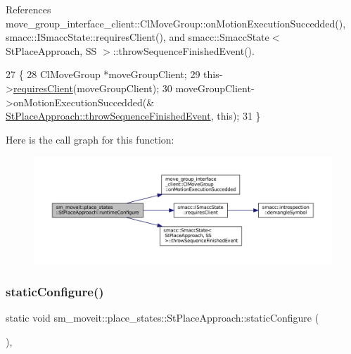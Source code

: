 References move\+\_\+group\+\_\+interface\+\_\+client\+::\+Cl\+Move\+Group\+::on\+Motion\+Execution\+Succedded(), smacc\+::\+I\+Smacc\+State\+::requires\+Client(), and smacc\+::\+Smacc\+State$<$ St\+Place\+Approach, S\+S $>$\+::throw\+Sequence\+Finished\+Event().


\begin{DoxyCode}
27     \{
28         ClMoveGroup *moveGroupClient;
29         this->\hyperlink{classsmacc_1_1ISmaccState_a7f95c9f0a6ea2d6f18d1aec0519de4ac}{requiresClient}(moveGroupClient);
30         moveGroupClient->onMotionExecutionSuccedded(&
      \hyperlink{classsmacc_1_1SmaccState_a49dcfc25824f7e083dd4b999c49ab2b6}{StPlaceApproach::throwSequenceFinishedEvent}, \textcolor{keyword}{this});
31     \}
\end{DoxyCode}
Here is the call graph for this function\+:
\nopagebreak
\begin{figure}[H]
\begin{center}
\leavevmode
\includegraphics[width=350pt]{structsm__moveit_1_1place__states_1_1StPlaceApproach_a287b39f8eb6a5aca4f0b1e63cb275f7a_cgraph}
\end{center}
\end{figure}
\mbox{\label{structsm__moveit_1_1place__states_1_1StPlaceApproach_a18cfb69a3268faad24cd10e4d1ff8877}} 
\subsubsection{\texorpdfstring{static\+Configure()}{staticConfigure()}}
{\footnotesize\ttfamily static void sm\+\_\+moveit\+::place\+\_\+states\+::\+St\+Place\+Approach\+::static\+Configure (\begin{DoxyParamCaption}{ }\end{DoxyParamCaption})\hspace{0.3cm}{\ttfamily [inline]}, {\ttfamily [static]}}



